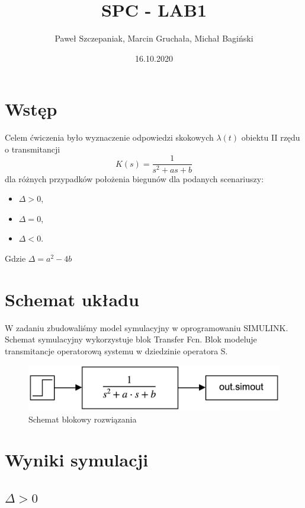 \documentclass[a4paper]{article}
\title{SPC - LAB1}
\author{Paweł Szczepaniak, Marcin Gruchała, Michał Bagiński}
\date{16.10.2020}
\begin{document}
\maketitle

\section{Wstęp}
    Celem ćwiczenia było wyznaczenie odpowiedzi skokowych $\lambda(t)$ obiektu II rzędu o transmitancji
    $$
    K(s)=\dfrac{1}{s^2+as+b}
    $$
    dla różnych przypadków położenia biegunów dla podanych scenariuszy:
        \begin{itemize}
            \item $\Delta > 0$,
            \item $\Delta = 0$,
            \item $\Delta < 0$.
        \end{itemize}
    Gdzie $\Delta = a^2-4b$ 
\section{Schemat układu}
  W zadaniu zbudowaliśmy model symulacyjny w oprogramowaniu SIMULINK. Schemat symulacyjny wykorzystuje blok Transfer Fcn. Blok modeluje transmitancje operatorową systemu w dziedzinie operatora S. 
\begin{figure}[H]
    \centering
    \includegraphics[scale=0.35]{simulink.png}
    \caption{Schemat blokowy rozwiązania}
\end{figure}
\section{Wyniki symulacji}
\subsection{$\Delta > 0$}
\end{document}
